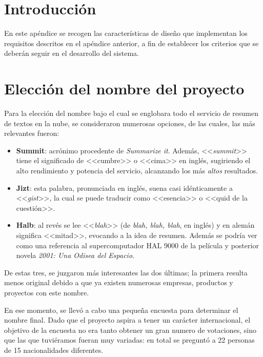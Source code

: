 
\section{Introducción}

En este apéndice se recogen las características de diseño que implementan los requisitos descritos en el apéndice anterior, a fin de establecer los criterios que se deberán seguir en el desarrollo del sistema.

\section{Elección del nombre del proyecto}

Para la elección del nombre bajo el cual se englobara todo el servicio de resumen de textos en la nube, se consideraron numerosas opciones, de las cuales, las más relevantes fueron:

\vspace{-0.2cm}
\begin{itemize} [\textbullet]
	\item \textbf{Summit}: acrónimo procedente de \emph{Summarize it}. Además, <<\emph{summit}>> tiene el significado de <<cumbre>> o <<cima>> en inglés, sugiriendo el alto rendimiento y potencia del servicio, alcanzando los más \emph{altos} resultados.
	
	\item \textbf{Jizt}: esta palabra, pronunciada en inglés, suena casi idénticamente a <<\emph{gist}>>, la cual se puede traducir como <<esencia>> o <<quid de la cuestión>>.
	
	\item \textbf{Halb}: al revés se lee <<\emph{blah}>> (de \emph{blah, blah, blah}, en inglés) y en alemán significa <<mitad>>, evocando a la idea de resumen. Además se podría ver como una referencia al supercomputador HAL 9000 de la película y posterior novela \emph{2001: Una Odisea del Espacio}.
\end{itemize}

De estas tres, se juzgaron más interesantes las dos últimas; la primera resulta menos original debido a que ya existen numerosas empresas, productos y proyectos con este nombre.

En ese momento, se llevó a cabo una pequeña encuesta para determinar el nombre final. Dado que el proyecto aspira a tener un carácter internacional, el objetivo de la encuesta no era tanto obtener un gran numero de votaciones, sino que las que tuviéramos fueran muy variadas: en total se preguntó a 22 personas de 15 nacionalidades diferentes.

